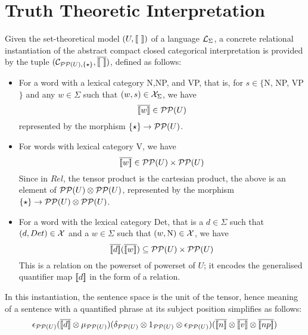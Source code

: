 \section{Truth Theoretic Interpretation}

Given the set-theoretical model $(U, [\![ \  ]\!])$ of a language ${\cal L}_{\Sigma}$, a concrete relational instantiation of the abstract compact closed categorical interpretation is  provided by the tuple $({\cal C}_{{\cal P}{\cal P}(U), \{\star\}}, \overline{[\![ \  ]\!]})$, defined as follows: 
\begin{itemize}
\item For a word with a lexical category N,NP, and VP, that is,  for $s \in \{$N, NP, VP$\}$ and any  $w \in \Sigma$ such that  $(w,s) \in {\cal X}_{\Sigma}$,  we have  
\[
\overline{[\![ w ]\!]} \in {\cal P}{\cal P}(U)
\]
represented by the morphism $\{\star\} \to {\cal P}{\cal P}(U)$. 

\item For words with lexical category V, we have
\[
\overline{[\![ w ]\!]} \in   {\cal P}{\cal P}(U) \times  {\cal P}{\cal P}(U) 
\]
Since in $Rel$, the tensor product is the cartesian product, the above is an element of ${\cal P}{\cal P}(U) \otimes {\cal P}{\cal P}(U)$, represented by the morphism $\{\star\} \to {\cal P}{\cal P}(U) \otimes {\cal P}{\cal P}(U)$. 

\item For a word with the lexical category Det, that is a $d \in \Sigma$ such that $(d, Det) \in {\cal X}$ and a $w \in \Sigma$ such that $(w, \text{N}) \in {\cal X}$, we have 
\[
\overline{[\![ d ]\!]}  (\overline{[\![ w ]\!]}) \subseteq {\cal P}{\cal P}(U) \times {\cal P}{\cal P}(U)
\]
This is a relation on the powerset of powerset of $U$; it encodes the generalised quantifier map $[\![ d ]\!]$ in the form of a relation.  
\end{itemize}

In this instantiation,   the sentence space is the unit of the tensor,   hence meaning of a sentence with a quantified phrase at its subject position simplifies as follows:
\[
\epsilon_{{\cal P}{\cal P}(U)}(\overline{\semantics{d}} \otimes  \mu_{{\cal P}{\cal P}(U)})(\delta_{{\cal P}{\cal P}(U)} \otimes 1_{{{\cal P}{\cal P}(U)}} \otimes \epsilon_{{\cal P}{\cal P}(U)})
(\overline{\semantics{n}} \otimes \overline{\semantics{{v}}} \otimes \overline{\semantics{np}})
\]



